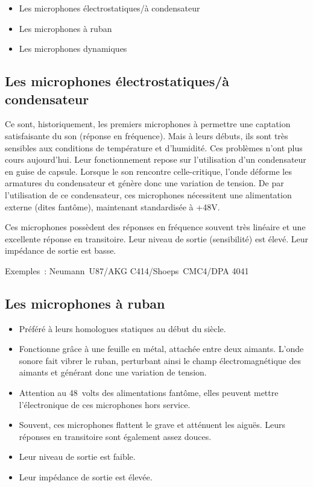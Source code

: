 \documentclass[
]{book}
\providecommand{\tightlist}{%
  \setlength{\itemsep}{0pt}\setlength{\parskip}{0pt}}
\begin{document}
\begin{itemize}
\tightlist
\item
  Les microphones électrostatiques/à condensateur
\item
  Les microphones à ruban
\item
  Les microphones dynamiques
\end{itemize}

\hypertarget{les-microphones-uxe9lectrostatiquesuxe0-condensateur}{%
\subsection{Les microphones électrostatiques/à condensateur}\label{les-microphones-uxe9lectrostatiquesuxe0-condensateur}}

Ce sont, historiquement, les premiers microphones à permettre une captation satisfaisante du son (réponse en fréquence). Mais à leurs débuts, ils sont très sensibles aux conditions de température et d'humidité. Ces problèmes n'ont plus cours aujourd'hui. Leur fonctionnement repose sur l'utilisation d'un condensateur en guise de capsule. Lorsque le son rencontre celle-critique, l'onde déforme les armatures du condensateur et génère donc une variation de tension. De par l'utilisation de ce condensateur, ces microphones nécessitent une alimentation externe (dites fantôme), maintenant standardisée à +48V.

Ces microphones possèdent des réponses en fréquence souvent très linéaire et une excellente réponse en transitoire. Leur niveau de sortie (sensibilité) est élevé. Leur impédance de sortie est basse.

Exemples~: Neumann~U87/AKG C414/Shoeps~CMC4/DPA 4041

\hypertarget{les-microphones-uxe0-ruban}{%
\subsection{Les microphones à ruban}\label{les-microphones-uxe0-ruban}}

\begin{itemize}
\tightlist
\item
  Préféré à leurs homologues statiques au début du siècle.
\item
  Fonctionne grâce à une feuille en métal, attachée entre deux aimants. L'onde sonore fait vibrer le ruban, perturbant ainsi le champ électromagnétique des aimants et générant donc une variation de tension.
\item
  Attention au 48~volts des alimentations fantôme, elles peuvent mettre l'électronique de ces microphones hors service.
\item
  Souvent, ces microphones flattent le grave et atténuent les aiguës. Leurs réponses en transitoire sont également assez douces.
\item
  Leur niveau de sortie est faible.
\item
  Leur impédance de sortie est élevée.
\end{itemize}
\end{document}
